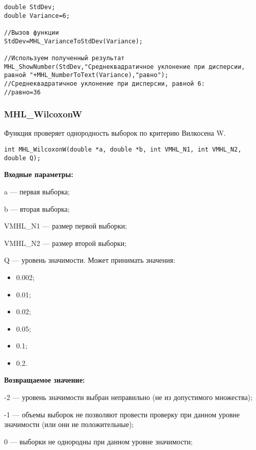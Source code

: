 \documentclass[a4paper,12pt]{article}
\begin{document}
\begin{lstlisting}[label=code_use_MHL_VarianceToStdDev,caption=Пример использования]
double StdDev;
double Variance=6;

//Вызов функции
StdDev=MHL_VarianceToStdDev(Variance);

//Используем полученный результат
MHL_ShowNumber(StdDev,"Среднеквадратичное уклонение при дисперсии, равной "+MHL_NumberToText(Variance),"равно");
//Среднеквадратичное уклонение при дисперсии, равной 6:
//равно=36
\end{lstlisting}

\subsubsection{MHL\_WilcoxonW}\label{MHL_WilcoxonW}

Функция проверяет однородность выборок по критерию Вилкосена W.


\begin{lstlisting}[label=code_syntax_MHL_WilcoxonW,caption=Синтаксис]
int MHL_WilcoxonW(double *a, double *b, int VMHL_N1, int VMHL_N2, double Q);
\end{lstlisting}

\textbf{Входные параметры:}

 a --- первая выборка;
 
b --- вторая выборка;
 
VMHL\_N1 --- размер первой выборки;
 
VMHL\_N2 --- размер второй выборки;
 
Q --- уровень значимости. Может принимать значения:
	
\begin{itemize}
\item 0.002;
\item 0.01; 
\item 0.02; 
\item 0.05; 
\item 0.1; 
\item 0.2.
\end{itemize}

\textbf{Возвращаемое значение:}

 -2 --- уровень значимости выбран неправильно (не из допустимого множества);
 
 -1 --- объемы выборок не позволяют провести проверку при данном уровне значимости (или они не положительные);
 
 0 --- выборки не однородны  при данном уровне значимости;
 
\end{document}

